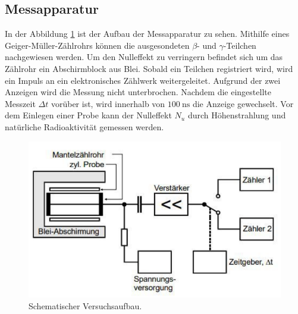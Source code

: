 \subsection{Messapparatur}
In der Abbildung \ref{fig:AufbauSkizze} ist der Aufbau der Messapparatur zu sehen.
Mithilfe eines Geiger-Müller-Zählrohrs können die ausgesondeten $\beta$- und $\gamma$-Teilchen nachgewiesen werden.
Um den Nulleffekt zu verringern befindet sich um das Zählrohr ein Abschirmblock aus Blei.
Sobald ein Teilchen registriert wird, wird ein Impuls an ein elektronisches Zählwerk weitergeleitet.
Aufgrund der zwei Anzeigen wird die Messung nicht unterbrochen.
Nachdem die eingestellte Messzeit $\Delta t $ vorüber ist, wird innerhalb von $\SI{100}{\nano\second}$ die Anzeige gewechselt.
Vor dem Einlegen einer Probe kann der Nulleffekt $N_u$ durch Höhenstrahlung und natürliche Radioaktivität gemessen werden.
\begin{figure}
    \includegraphics[width=\textwidth]{content/AufbauSkizze.pdf}
    \caption{Schematischer Versuchsaufbau.\cite{anleitung}}
    \label{fig:AufbauSkizze}
\end{figure}